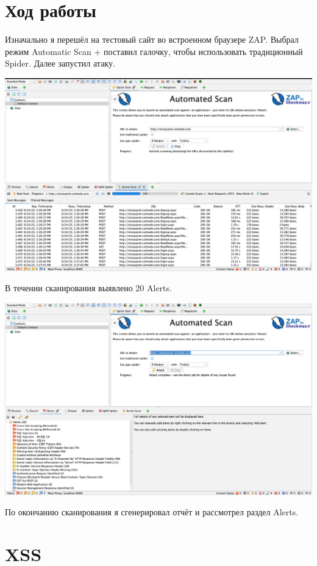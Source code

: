 \documentclass{article}
\begin{document}
\section{Ход работы}

Изначально я перешёл на тестовый сайт во встроенном браузере ZAP. Выбрал режим Automatic Scan + поставил галочку, чтобы использовать традиционный Spider. Далее запустил атаку.

\begin{center}
  \includegraphics[width=.9\textwidth]{scan}
\end{center}

В течении сканирования выявлено 20 Alerts. 

\begin{center}
  \includegraphics[width=.9\textwidth]{end}
\end{center}

По окончанию сканирования я сгенерировал отчёт и рассмотрел раздел Alerts.

\section{XSS}
\end{document}
